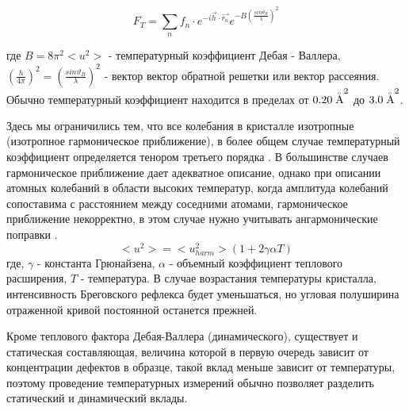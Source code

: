  \begin{equation}
   F_T =  \sum_{n} f_n \cdot  e^{-i\vec {h} \cdot \vec{r_n}}  e^{-B (\frac{sin\theta_B}{\lambda} )^2 }
  \end{equation}

 где $B = 8 \pi^2 <u^2>$ - температурный коэффициент Дебая - Валлера,
 $(\frac{h}{4\pi})^2=(\frac{sin\vartheta_B}{\lambda})^2$ -
 вектор вектор обратной решетки или вектор рассеяния. Обычно температурный коэффициент
 находится в пределах от $0.20 \angstrom ^2$ до $3.0 \angstrom ^2$.

 Здесь мы ограничились тем, что все колебания в кристалле изотропные
 (изотропное гармоническое приближение), в более общем случае
 температурный коэффициент определяется тенором третьего порядка \cite{Willis1975}.
 В большинстве случаев гармоническое приближение дает адекватное описание, однако при описании
 атомных колебаний в области высоких температур, когда амплитуда колебаний сопоставима с расстоянием
 между соседними атомами, гармоническое приближение некорректно, в этом случае нужно учитывать ангармонические
 поправки \cite{kibalin2015}.
 \begin{equation}
   <u^2> = <u^2_{harm}> (1+2\gamma \alpha T)
  \end{equation}
  где, $\gamma$ - константа Грюнайзена, $\alpha$ - объемный коэффициент теплового расширения, $T$ - температура.
  В случае возрастания температуры кристалла, интенсивность Бреговского рефлекса будет уменьшаться,
  но угловая полуширина отраженной кривой постоянной останется прежней.

 Кроме теплового фактора Дебая-Валлера (динамического), существует и статическая составляющая,
 величина которой в первую очередь зависит от концентрации дефектов в образце,
 такой вклад меньше зависит от температуры, поэтому проведение температурных измерений
 обычно позволяет разделить статический и динамический вклады.


%

%
